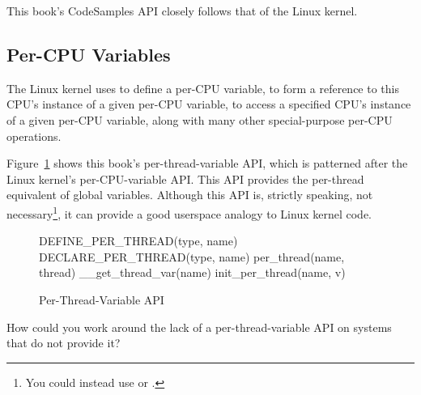 This book's CodeSamples API closely follows that of the Linux kernel.

\subsection{Per-CPU Variables}
\label{sec:toolsoftrade:Per-CPU Variables}

The Linux kernel uses  to define a per-CPU variable,
 to form a reference to this CPU's instance of a
given per-CPU variable,  to access a specified CPU's
instance of a given per-CPU variable, along with many other special-purpose
per-CPU operations.

Figure~\ref{fig:toolsoftrade:Per-Thread-Variable API}
shows this book's per-thread-variable API, which is patterned
after the Linux kernel's per-CPU-variable API.
This API provides the per-thread equivalent of global variables.
Although this API is, strictly speaking, not necessary\footnote{
	You could instead use  or .},
it can provide a good userspace analogy to Linux kernel code.

\begin{figure}[htbp]
{ \scriptsize
\begin{verbbox}
DEFINE_PER_THREAD(type, name)
DECLARE_PER_THREAD(type, name)
per_thread(name, thread)
__get_thread_var(name)
init_per_thread(name, v)
\end{verbbox}
}
\centering
\theverbbox
\caption{Per-Thread-Variable API}
\label{fig:toolsoftrade:Per-Thread-Variable API}
\end{figure}

\QuickQuiz{}
	How could you work around the lack of a per-thread-variable
	API on systems that do not provide it?
 \QuickQuizEnd

